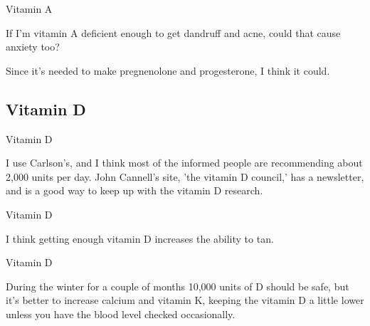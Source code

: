 \documentclass[11pt,oneside,openany,extrafontsizes]{memoir}
\begin{document}
\begin{qaexchange}{Vitamin A}

    \begin{question}
        If I'm vitamin A deficient enough to get dandruff and acne, could that cause anxiety too?
    \end{question}

    \begin{answer}
      Since it's needed to make pregnenolone and progesterone, I think it could.
    \end{answer}
\end{qaexchange}

\subsection{Vitamin D}

\begin{standalonequote}{Vitamin D}

    \begin{answer}
        I use Carlson's, and I think most of the informed people are recommending about 2,000 units per day. John Cannell's site, 'the vitamin D council,' has a newsletter, and is a good way to keep up with the vitamin D research.
    \end{answer}
\end{standalonequote}

\begin{standalonequote}{Vitamin D}

    \begin{answer}
        I think getting enough vitamin D increases the ability to tan.
    \end{answer}
\end{standalonequote}

\begin{standalonequote}{Vitamin D}

    \begin{answer}
        During the winter for a couple of months 10,000 units of D should be safe, but it's better to increase calcium and vitamin K, keeping the vitamin D a little lower unless you have the blood level checked occasionally.
    \end{answer}
\end{standalonequote}
\end{document}
